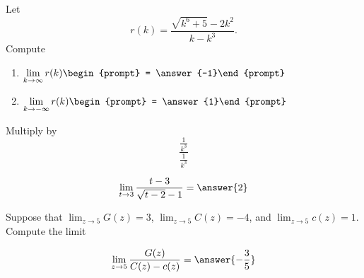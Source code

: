 \documentclass[handout]{ximera}
\begin{document}
\begin{exercise}
Let 
\[
r(k) = \frac{\sqrt{k^6+5}-2 k^2}{k-k^3}.
\]
Compute
\begin{enumerate}
\item $\displaystyle\lim_{k\to \infty} r(k) \begin{prompt} = \answer{-1}\end{prompt}$
\item $\displaystyle\lim_{k\to -\infty}r(k) \begin{prompt} = \answer{1}\end{prompt}$
\end{enumerate}
\begin{hint}
Multiply by
\[
\frac{\frac{1}{k^3}}{\frac{1}{k^3}}
\]
\end{hint}
\end{exercise}

\begin{exercise}
\[
\lim_{t\to 3 } \frac{t-3}{\sqrt{t-2}-1} = \answer{2}
\]
\end{exercise}


\begin{exercise}
Suppose that $\lim_{z\to5}G(z)=3$, $\lim_{z\to5}C(z)=-4$, and $\lim_{z\to5}c(z)=1$. Compute the limit

\[
\lim_{z\to 5 } \frac{G(z)}{C(z)-c(z)} = \answer{-\frac{3}{5}}
\]
\end{exercise}
\end{document}
